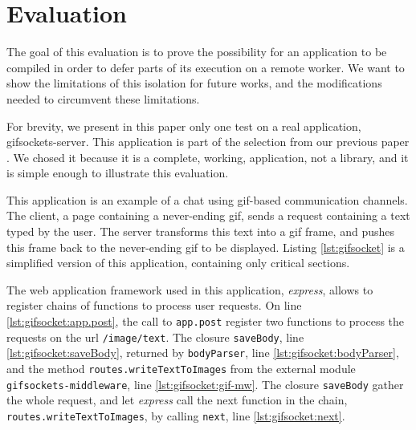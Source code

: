 \section{Evaluation} \label{section:evaluation}

The goal of this evaluation is to prove the possibility for an application to be compiled in order to defer parts of its execution on a remote worker.
We want to show the limitations of this isolation for future works, and the modifications needed to circumvent these limitations.

For brevity, we present in this paper only one test on a real application, gifsockets-server.
This application is part of the selection from our previous paper \cite{Brodu2015}.
We chosed it because it is a complete, working, application, not a library, and it is simple enough to illustrate this evaluation.

This application is an example of a chat using gif-based communication channels.
The client, a page containing a never-ending gif, sends a request containing a text typed by the user.
The server transforms this text into a gif frame, and pushes this frame back to the never-ending gif to be displayed.
Listing \ref{lst:gifsocket} is a simplified version of this application, containing only critical sections.

The web application framework used in this application, \textit{express}, allows to register chains of functions to process user requests.
On line \ref{lst:gifsocket:app.post}, the call to \texttt{app.post} register two functions to process the requests on the url \texttt{/image/text}.
The closure \texttt{saveBody}, line \ref{lst:gifsocket:saveBody}, returned by \texttt{bodyParser}, line \ref{lst:gifsocket:bodyParser}, and the method \texttt{routes.write\-Text\-To\-Images} from the external module \texttt{gifsockets-middleware}, line \ref{lst:gifsocket:gif-mw}.
The closure \texttt{saveBody} gather the whole request, and let \textit{express} call the next function in the chain, \texttt{routes.write\-Text\-To\-Images}, by calling \texttt{next}, line \ref{lst:gifsocket:next}.

